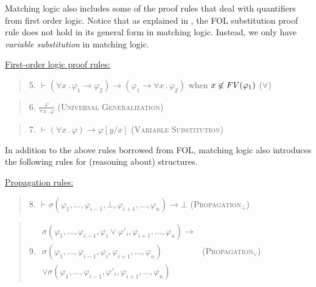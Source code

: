 \documentclass[UTF8,11pt]{article}
\theoremstyle{plain}
\theoremstyle{definition}
\theoremstyle{remark}
\newcommand{\imp}{\to}
\newcommand{\ddd}{,\dots,}
\newcommand{\ra}{\rightarrow}
\newcommand{\FV}{{\it FV}}
\begin{document}
Matching logic also includes some of the proof rules
that deal with quantifiers from first order logic.
Notice that as explained in \cite{rosu-2017-lmcs}, 
the FOL substitution proof rule
does not hold in its general form in matching logic.
Instead, we only have
\emph{variable substitution} in matching logic.

\vspace*{2ex}

\noindent
\underline{First-order logic proof rules:}

\begin{quote}
5. $\vdash (\forall x\,.\,\varphi_1\ra\varphi_2) \ra (\varphi_1 \ra \forall x\,.\,\varphi_2)$
when $x\not\in\FV(\varphi_1)$
\hfill \textsc{($\forall$)}
\end{quote}

\begin{quote}
6. $\displaystyle\frac{\varphi}{\forall x\,.\,\varphi}$
\hfill \textsc{(Universal Generalization)}
\end{quote}

\begin{quote}
7. $\vdash (\forall x\,.\,\varphi) \ra \varphi[y/x]$
\hfill \textsc{(Variable Substitution)}
\end{quote}

In addition to the above rules borrowed from FOL, matching
logic also introduces the following rules for (reasoning about) structures.

\vspace*{2ex}

\noindent
\underline{Propagation rules:}

\begin{quote}
8. $\vdash \sigma(\varphi_1 \ddd \varphi_{i-1}, \bot,
                  \varphi_{i+1} \ddd \varphi_n)
           \imp \bot$
\hfill \textsc{(Propagation$_\bot$)}
\end{quote}

\begin{quote}
9.
$
\begin{array}{l}
\sigma(
\varphi_1 \ddd \varphi_{i-1}, 
\varphi_i \vee \varphi'_i,
\varphi_{i+1} \ddd \varphi_n) \imp
\\
\sigma(\varphi_1 \ddd \varphi_{i-1}, \varphi_i,
\varphi_{i+1} \ddd \varphi_n)
\\
\vee
\sigma(\varphi_1 \ddd \varphi_{i-1}, \varphi'_i,
\varphi_{i+1} \ddd \varphi_n)
\end{array}
$
\hfill \textsc{(Propagation$_\vee$)}
\end{quote}
\end{document}
